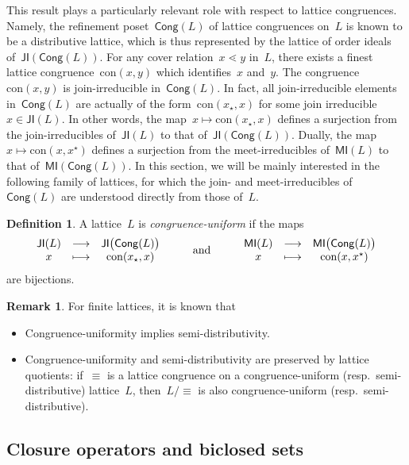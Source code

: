 \documentclass{memo-l}
\theoremstyle{definition}
\newtheorem{definition}[theorem]{Definition}
\newtheorem{remark}[theorem]{Remark}
\newcommand{\darkblue}{\color{darkblue}} %
\newcommand{\defn}[1]{\textsl{\darkblue #1}} %
\newcommand{\JI}{\mathsf{JI}} %
\newcommand{\MI}{\mathsf{MI}} %
\newcommand{\Cong}{\mathsf{Cong}} %
\newcommand{\con}{\mathrm{con}} %
\begin{document}
This result plays a particularly relevant role with respect to lattice congruences.
Namely, the refinement poset~$\Cong(L)$ of lattice congruences on~$L$ is known to be a distributive lattice, which is thus represented by the lattice of order ideals of~$\JI(\Cong(L))$.
For any cover relation~$x \lessdot y$ in~$L$, there exists a finest lattice congruence~$\con(x,y)$ which identifies~$x$ and~$y$.
The congruence~$\con(x,y)$ is join-irreducible in~$\Cong(L)$.
In fact, all join-irreducible elements in~$\Cong(L)$ are actually of the form~$\con(x_\star,x)$ for some join irreducible~$x \in \JI(L)$.
In other words, the map~$x \mapsto \con(x_\star,x)$ defines a surjection from the join-irreducibles of~$\JI(L)$ to that of~$\JI(\Cong(L))$.
Dually, the map~${x \mapsto \con(x,x^\star)}$ defines a surjection from the meet-irreducibles of~$\MI(L)$ to that of~$\MI(\Cong(L))$.
In this section, we will be mainly interested in the following family of lattices, for which the join- and meet-irreducibles of~$\Cong(L)$ are understood directly from those of~$L$.

\begin{definition}
A lattice~$L$ is \defn{congruence-uniform} if the maps
\[
\begin{array}{ccccccc}
\JI(L) & \longrightarrow & \JI\big(\Cong(L)\big) &
\multirow{2}{*}{\qquad\text{and}\qquad} & 
\MI(L) & \longrightarrow & \MI\big(\Cong(L)\big) \\
x & \longmapsto & \con(x_\star,x) & & x & \longmapsto & \con(x,x^\star)
\end{array}
\]
are bijections.
\end{definition}

\begin{remark}
For finite lattices, it is known that 
\begin{itemize}
\item Congruence-uniformity implies semi-distributivity.
\item Congruence-uniformity and semi-distributivity are preserved by lattice quotients: if~$\equiv$ is a lattice congruence on a congruence-uniform (resp.~semi-distributive) lattice~$L$, then~$L/{\equiv}$ is also congruence-uniform (resp.~semi-distributive).
\end{itemize}
\end{remark}

\subsection{Closure operators and biclosed sets}
\end{document}
